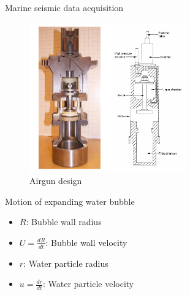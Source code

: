 \documentclass[xcolor=dvipsnames,notes]{beamer}
\begin{document}
\begin{frame}{Marine seismic data acquisition}
\begin{figure}
  \includegraphics[width=0.6\textwidth]{Fig/airgun2.png}
  \caption{Airgun design}
  \label{fig:airgun2}
\end{figure}
\end{frame}
\begin{frame}{Motion of expanding water bubble}
\begin{itemize}
\item $R$: Bubble wall radius
\item $U=\frac{dR}{dt}$: Bubble wall velocity
\item $r$: Water particle radius
\item $u=\frac{dr}{dt}$: Water particle velocity
\end{itemize}
\end{frame}
\end{document}
